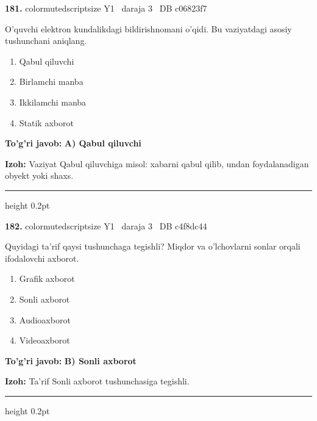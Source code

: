 \documentclass[10pt,a4paper,oneside]{article}
\begin{document}
\noindent\textbf{\color{ink}181.}  {color{muted}scriptsize Y1 \textbullet\ daraja 3 \textbullet\ DB c06823f7}
\par
O'quvchi elektron kundalikdagi bildirishnomani o'qidi. Bu vaziyatdagi asosiy tushunchani aniqlang.
\begin{enumerate}[label=\Alph*),leftmargin=9mm]
\item Qabul qiluvchi
\item Birlamchi manba
\item Ikkilamchi manba
\item Statik axborot
\end{enumerate}
\begin{tcolorbox}[enhanced,breakable,colback=teal!4,colframe=teal!50!black,boxrule=0.5pt,arc=1.1mm,left=3mm,right=3mm,top=1.7mm,bottom=1.7mm,before skip=2mm,after skip=2mm]
\textbf{\color{teal}To'g'ri javob:} \textbf{A) Qabul qiluvchi}
\par\smallskip
\textbf{Izoh:} Vaziyat Qabul qiluvchiga misol: xabarni qabul qilib, undan foydalanadigan obyekt yoki shaxs.
\end{tcolorbox}
\vspace{2mm}\hrule height 0.2pt \vspace{3mm}

\noindent\textbf{\color{ink}182.}  {color{muted}scriptsize Y1 \textbullet\ daraja 3 \textbullet\ DB c4f8dc44}
\par
Quyidagi ta'rif qaysi tushunchaga tegishli? Miqdor va o'lchovlarni sonlar orqali ifodalovchi axborot.
\begin{enumerate}[label=\Alph*),leftmargin=9mm]
\item Grafik axborot
\item Sonli axborot
\item Audioaxborot
\item Videoaxborot
\end{enumerate}
\begin{tcolorbox}[enhanced,breakable,colback=teal!4,colframe=teal!50!black,boxrule=0.5pt,arc=1.1mm,left=3mm,right=3mm,top=1.7mm,bottom=1.7mm,before skip=2mm,after skip=2mm]
\textbf{\color{teal}To'g'ri javob:} \textbf{B) Sonli axborot}
\par\smallskip
\textbf{Izoh:} Ta'rif Sonli axborot tushunchasiga tegishli.
\end{tcolorbox}
\vspace{2mm}\hrule height 0.2pt \vspace{3mm}
\end{document}
